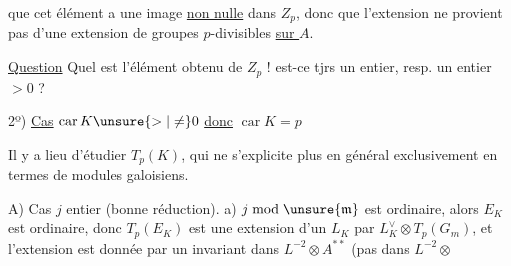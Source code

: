 que cet élément a une image \uline{non nulle} dans $Z_p$, donc que l'extension ne provient pas d'une extension de groupes $p$-divisibles \uline{sur $A$}.

\uline{Question} Quel est l'élément obtenu de $Z_p$ ! est-ce tjrs un entier, resp. un entier $>0$ ?

2º) \uline{Cas} $\operatorname{car}K\unsure{>|\ne}0$ \uline{donc} $\operatorname{car}K=p$

 Il y a lieu d'étudier $T_p(K)$, qui ne s'explicite plus en général exclusivement en termes de modules galoisiens.

A) Cas $j$ entier (bonne réduction). a)  $j \bmod \unsure{\mathfrak m}$ est ordinaire, alors $E_K$ est ordinaire, donc
$T_p(E_K)$ est une extension d'un $L_K$ par $L_K^{\vee}\otimes T_p(G_m)$, et l'extension est donnée par un invariant dans $L^{-2}\otimes A^{**}$ (pas  dans $L^{-2}\otimes$
